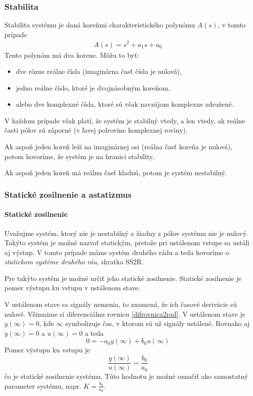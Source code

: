 \documentclass[a4paper, 10pt, ]{article}
\begin{document}
\subsubsection{Stabilita}

Stabilita systému je daná koreňmi charakteristického polynómu $A(s)$, v tomto prípade
\begin{align}
    A(s) = s^2 + a_1 s + a_0
\end{align}
Tento polynóm má dva korene. Môžu to byť:
\begin{itemize}[leftmargin=0pt, labelsep=3mm, itemsep=0pt]
    \item dve rôzne reálne čísla (imaginárna časť čísla je nulová),
    \item jedno reálne číslo, ktoré je dvojnásobným koreňom,
    \item alebo dve komplexné čísla, ktoré sú však navzájom komplexne združené.
\end{itemize}
V každom prípade však platí, že systém je stabilný vtedy, a len vtedy, ak reálne časti pólov sú záporné (v ľavej polrovine komplexnej roviny).

Ak aspoň jeden koreň leží na imaginárnej osi (reálna časť koreňa je nulová), potom hovoríme, že systém je na hranici stability.

Ak aspoň jeden koreň má reálnu časť kladnú, potom je systém nestabilný.








\subsubsection{Statické zosilnenie a astatizmus}

\paragraph{Statické zosilnenie}

Uvažujme systém, ktorý nie je nestabilný a žiadny z pólov systému nie je nulový. Takýto systém je možné nazvať statickým, pretože pri ustálenom vstupe sa ustáli aj výstup. V tomto prípade máme systém druhého rádu a teda hovoríme o \emph{statickom systéme druhého ráu}, skratka SS2R. 

Pre takýto systém je možné určiť jeho statické zosilnenie. Statické zosilnenie je pomer výstupu ku vstupu v ustálenom stave.

V ustálenom stave sa signály nemenia, to znamená, že ich časové derivácie sú nulové. Všimnime si diferenciálnu rovnicu \eqref{difrovnica2rad}. 
V ustálenom stave je $\dot y(\infty) = 0$, kde $\infty$ symbolizuje čas, v ktorom sú už signály ustálené. Rovnako aj $\ddot y(\infty) = 0$ a $\dot u(\infty) = 0$ a teda
\begin{equation}
    0 = -a_0 y(\infty) + b_0 u(\infty)
\end{equation}
Pomer výstupu ku vstupu je
\begin{equation}
    \frac{y(\infty)}{u(\infty)} = \frac{b_0}{a_0}
\end{equation}
čo je statické zosilnenie systému. Túto hodnotu je možné označiť ako samostatný parameter systému, napr. $K = \frac{b_0}{a_0}$.
\end{document}
